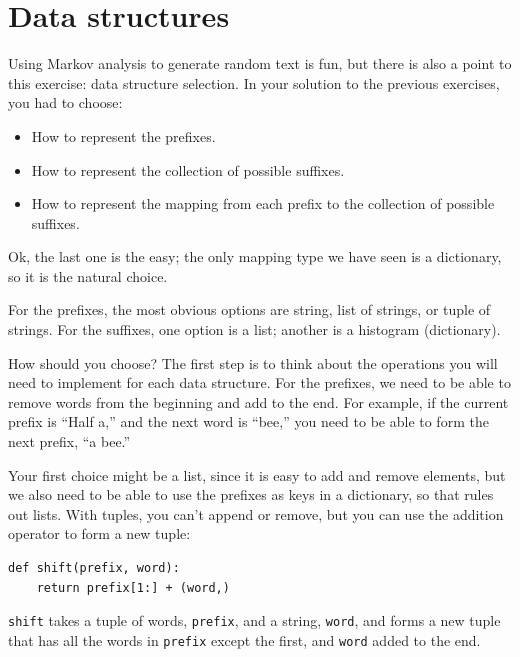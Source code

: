 \documentclass[10pt]{book}
\begin{document}
\section{Data structures}

Using Markov analysis to generate random text is fun, but there is
also a point to this exercise: data structure selection.  In your
solution to the previous exercises, you had to choose:

\begin{itemize}

\item How to represent the prefixes.

\item How to represent the collection of possible suffixes.

\item How to represent the mapping from each prefix to
the collection of possible suffixes.

\end{itemize}

Ok, the last one is the easy; the only mapping type we have
seen is a dictionary, so it is the natural choice.

For the prefixes, the most obvious options are string,
list of strings, or tuple of strings.  For the suffixes,
one option is a list; another is a histogram (dictionary).

How should you choose?  The first step is to think about
the operations you will need to implement for each data structure.
For the prefixes, we need to be able to remove words from
the beginning and add to the end.  For example, if the current
prefix is ``Half a,'' and the next word is ``bee,'' you need
to be able to form the next prefix, ``a bee.''

Your first choice might be a list, since it is easy to add
and remove elements, but we also need to be able to use the
prefixes as keys in a dictionary, so that rules out lists.
With tuples, you can't append or remove, but you can use
the addition operator to form a new tuple:

\begin{verbatim}
def shift(prefix, word):
    return prefix[1:] + (word,)
\end{verbatim}
%
{\tt shift} takes a tuple of words, {\tt prefix}, and a string,
{\tt word}, and forms a new tuple that has all the words
in {\tt prefix} except the first, and {\tt word} added to
the end.
\end{document}
